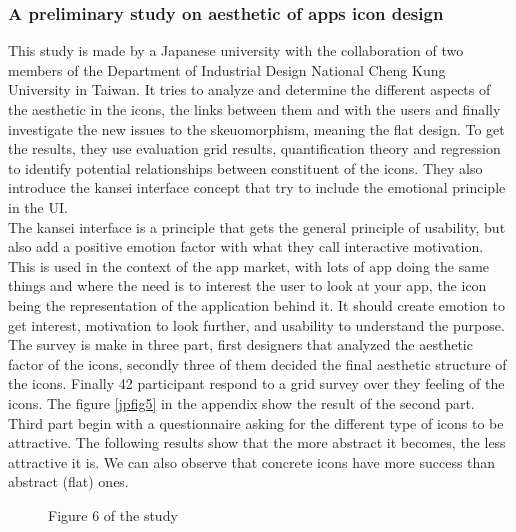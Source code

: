 \documentclass[a4paper,11pt] {article}
\theoremstyle{definition}
\begin{document}
    \subsubsection{A preliminary study on aesthetic of apps icon design}

    This study \cite{jpAnalitics} is made by a Japanese university with the collaboration of two members of the Department of Industrial Design National Cheng Kung University in Taiwan. It tries to analyze and determine the different aspects of the aesthetic in the icons, the links between them and with the users and finally investigate the new issues to the skeuomorphism, meaning the flat design. To get the results, they use evaluation grid results, quantification theory and regression to identify potential relationships between constituent of the icons. They also introduce the kansei interface concept that try to include the emotional principle in the UI.\\

    The kansei interface is a principle that gets the general principle of usability, but also add a positive emotion factor with what they call interactive motivation. This is used in the context of the app market, with lots of app doing the same things and where the need is to interest the user to look at your app, the icon being the representation of the application behind it. It should create emotion to get interest, motivation to look further, and usability to understand the purpose.\\

    The survey is make in three part, first designers that analyzed the aesthetic factor of the icons, secondly three of them decided the final aesthetic structure of the icons. Finally 42 participant respond to a grid survey over they feeling of the icons. The figure \ref{jpfig5} in the appendix show the result of the second part.\\

    Third part begin with a questionnaire asking for the different type of icons to be attractive. The following results show that the more abstract it becomes, the less attractive it is. We can also observe that concrete icons have more success than abstract (flat) ones.

    \begin{figure}[H]
      \caption{Figure 6 of the study \label{jpfig6}}
    \end{figure}
\end{document}
